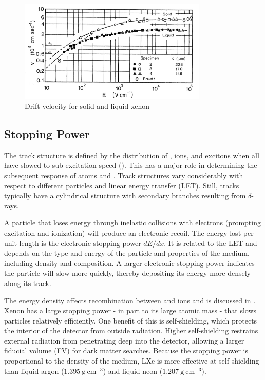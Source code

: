 \begin{figure}
\includegraphics[angle=0.5, width=0.8\textwidth]{DriftVelocity}
\caption{Drift velocity for solid and liquid xenon}
\label{fig:drift_velocity}
\end{figure}




\subsection{Stopping Power}
\label{subsec:stopping_power}
The track structure is defined by the distribution of \electron, ions, and excitons when all \electron have slowed to sub-excitation
speed ().  This has a major role in determining the subsequent response of atoms and \electron.  Track structures
vary considerably with respect to different particles and linear energy transfer (LET).  Still, tracks typically have a cylindrical
structure with secondary branches resulting from $\delta$-rays.

A particle that loses energy through inelastic collisions with electrons (prompting excitation and ionization) will produce an electronic
recoil.  The energy lost per unit
length is the electronic stopping power $dE/dx$.  It is related to the LET and depends on the
type and energy of the particle and properties of the
medium, including density and composition.  A larger electronic stopping power indicates the particle will slow more quickly, thereby
depositing its energy more densely along its track.

The energy density affects recombination between \electron and ions and is discussed in .  Xenon
has a large stopping power - in part to its large atomic mass - that slows particles relatively efficiently.  One benefit of this
is self-shielding, which protects the interior of the detector from outside radiation.  Higher self-shielding restrains external
radiation from penetrating deep into the detector,
allowing a larger fiducial volume (FV) for dark matter searches.  Because the stopping power is proportional to the
density of the medium, LXe is more effective at self-shielding than liquid argon ($1.395\ \mathrm{g\ cm^{-3}}$) and liquid neon
($1.207\ \mathrm{g\ cm^{-3}}$).

